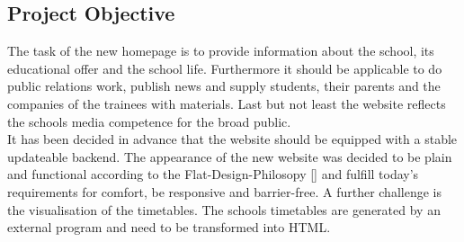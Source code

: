 \subsection{Project Objective}
\label{sec:ProjectObjective}
The task of the new homepage is to provide information about the school, its  educational offer and the school life. 
Furthermore it should be applicable to do public relations work, publish news and supply students, 
their parents and the companies of the trainees with materials. Last but not least the website reflects 
the schools media competence for the broad public.\\
It has been decided in advance that the website should be equipped with a stable updateable backend. 
The appearance of the new website was decided to be plain and functional according to the Flat-Design-Philosopy [\cite{Wik1}]
and fulfill today's requirements for comfort, be responsive and barrier-free. 
A further challenge is the visualisation of the timetables. The schools timetables are 
generated by an external program and need to be transformed into \acs{HTML}.